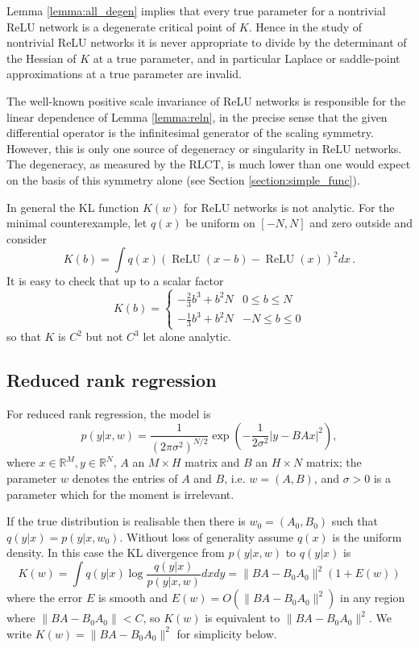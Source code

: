 \documentclass{article} %
\begin{document}
\begin{remark}\label{remark:byebye_laplace}
Lemma \ref{lemma:all_degen} implies that every true parameter for a nontrivial ReLU network is a degenerate critical point of $K$. Hence in the study of nontrivial ReLU networks it is never appropriate to divide by the determinant of the Hessian of $K$ at a true parameter, and in particular Laplace or saddle-point approximations at a true parameter are invalid.
\end{remark}

The well-known positive scale invariance of ReLU networks \citep{phuong2020functional} is responsible for the linear dependence of Lemma \ref{lemma:reln}, in the precise sense that the given differential operator is the infinitesimal generator \citep[\S IV.3]{boothby1986introduction} of the scaling symmetry. However, this is only one source of degeneracy or singularity in ReLU networks. The degeneracy, as measured by the RLCT, is much lower than one would expect on the basis of this symmetry alone (see Section \ref{section:simple_func}).

\begin{example}\label{example:not_analytic} In general the KL function $K(w)$ for ReLU networks is not analytic. For the minimal counterexample, let $q(x)$ be uniform on $[-N, N]$ and zero outside and consider
\[
K(b) = \int q(x) ( \operatorname{ReLU}(x - b) - \operatorname{ReLU}(x) )^2 dx\,.
\]
It is easy to check that up to a scalar factor
\[
K(b) = \begin{cases} -\tfrac{2}{3} b^3 + b^2 N & 0 \le b \le N \\
-\tfrac{1}{3} b^3 + b^2 N & -N \le b \le 0
\end{cases}
\]
so that $K$ is $C^2$ but not $C^3$ let alone analytic.
\end{example}

\subsection{Reduced rank regression} \label{appendix:reducedrank}
For reduced rank regression, the model is
$$
p( y \rvert x, w) = \frac{1}{(2\pi \sigma^2)^{N/2}} \exp\left( -
\frac{1}{2 \sigma^2} | y - BA x|^2\right),
$$
where $x \in \mathbb{R}^M, y \in \mathbb{R}^N$, $A$ an $M \times H$
matrix and $B$ an $H \times N$ matrix; the parameter $w$ denotes the
entries of $A$ and $B$, i.e. $w = (A, B)$, and $\sigma > 0$ is a
parameter which for the moment is irrelevant.

If the true distribution is realisable then there is $w_0 = (A_0,
B_0)$ such that $q(y|x) = p(y \rvert x, w_0)$.  Without loss of generality assume $q(x)$ is the uniform density. In this case the KL
divergence from $p(y \rvert x, w)$ to $q(y|x)$ is
$$
K(w) = \int q(y|x) \log \frac{q(y|x)}{p(y|x, w)} dxdy = \| BA -
B_0A_0 \|^2 \left( 1 + E(w) \right)
$$
where the error $E$ is smooth and $E(w) = O(\| BA -
B_0A_0 \|^2)$ in any region where $\| BA -
B_0A_0 \| < C$, so $K(w)$ is equivalent to $\|BA - B_0 A_0\|^2$.  We
write $K(w) = \|BA - B_0 A_0\|^2$ for simplicity below.
\end{document}
